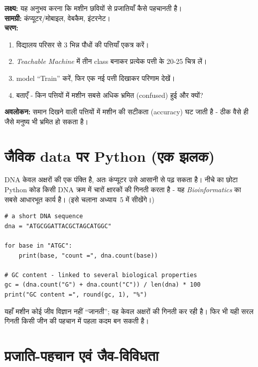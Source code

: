 \begin{gatividhi}
\textbf{लक्ष्य:} यह अनुभव करना कि मशीन छवियों से प्रजातियाँ कैसे पहचानती है।\\[4pt]
\textbf{सामग्री:} कंप्यूटर/मोबाइल, वेबकैम, इंटरनेट।\\[4pt]
\textbf{चरण:}
\begin{enumerate}[leftmargin=1.6em]
  \item विद्यालय परिसर से 3 भिन्न पौधों की पत्तियाँ एकत्र करें।
  \item \emph{Teachable Machine} में तीन class बनाकर प्रत्येक पत्ती के 20-25 चित्र लें।
  \item model “Train” करें, फिर एक नई पत्ती दिखाकर परिणाम देखें।
  \item बताएँ - किन पत्तियों में मशीन सबसे अधिक भ्रमित (confused) हुई और क्यों?
\end{enumerate}
\textbf{अवलोकन:} समान दिखने वाली पत्तियों में मशीन की सटीकता (accuracy) घट जाती है -
ठीक वैसे ही जैसे मनुष्य भी भ्रमित हो सकता है।
\end{gatividhi}

\section{जैविक data पर Python (एक झलक)}

DNA केवल अक्षरों की एक पंक्ति है, अतः कंप्यूटर उसे आसानी से पढ़ सकता है। नीचे का छोटा
Python कोड किसी DNA क्रम में चारों क्षारकों की गिनती करता है - यह \emph{Bioinformatics}
का सबसे आधारभूत कार्य है। (इसे चलाना अध्याय~5 में सीखेंगे।)

\begin{lstlisting}
# a short DNA sequence
dna = "ATGCGGATTACGCTAGCATGGC"

for base in "ATGC":
    print(base, "count =", dna.count(base))

# GC content - linked to several biological properties
gc = (dna.count("G") + dna.count("C")) / len(dna) * 100
print("GC content =", round(gc, 1), "%")
\end{lstlisting}

\noindent यहाँ मशीन कोई जीव विज्ञान नहीं “जानती”; वह केवल अक्षरों की गिनती कर रही है।
फिर भी यही सरल गिनती किसी जीन की पहचान में पहला कदम बन सकती है।

\section{प्रजाति-पहचान एवं जैव-विविधता}

